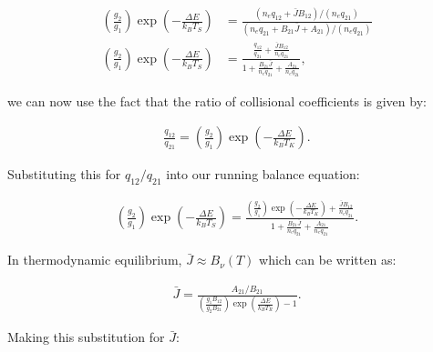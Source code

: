 \documentclass[12pt]{article}
\begin{document}
\begin{equation*}
\begin{split}
\left(\frac{g_2}{g_1}\right)\exp\left(-\frac{\Delta E}{k_BT_S}\right) &= \frac{ (n_eq_{12} + \bar{J}B_{12})/(n_eq_{21})}{(n_eq_{21} + B_{21}\bar{J} + A_{21})/(n_eq_{21})}\\
\left(\frac{g_2}{g_1}\right)\exp\left(-\frac{\Delta E}{k_BT_S}\right) &= \frac{ \frac{q_{12}}{q_{21}} + \frac{\bar{J}B_{12}}{n_eq_{21}} }{1 + \frac{B_{21}\bar{J}}{n_eq_{21}} + \frac{A_{21}}{n_eq_{21}}},
\end{split}
\end{equation*}

we can now use the fact that the ratio of collisional coefficients is given by:

\begin{align*}
\frac{q_{12}}{q_{21}} = \left(\frac{g_2}{g_1}\right)\exp\left(-\frac{\Delta E}{k_BT_K}\right).
\end{align*}

Substituting this for $q_{12}/q_{21}$ into our running balance equation:

\begin{equation*}
\begin{split}
\left(\frac{g_2}{g_1}\right)\exp\left(-\frac{\Delta E}{k_BT_S}\right) = \frac{ \left(\frac{g_2}{g_1}\right)\exp\left(-\frac{\Delta E}{k_BT_K}\right) + \frac{\bar{J}B_{12}}{n_eq_{21}} }{1 + \frac{B_{21}\bar{J}}{n_eq_{21}} + \frac{A_{21}}{n_eq_{21}}}.
\end{split}
\end{equation*}

In thermodynamic equilibrium, $\bar{J} \approx B_\nu(T)$ which can be written as:

\begin{align*}
\bar{J} = \frac{A_{21}/B_{21}}{\left(\frac{g_1B_{12}}{g_2B_{21}}\right)\exp\left(\frac{\Delta E}{k_BT_R}\right)-1}.
\end{align*}

Making this substitution for $\bar{J}$:
\end{document}

